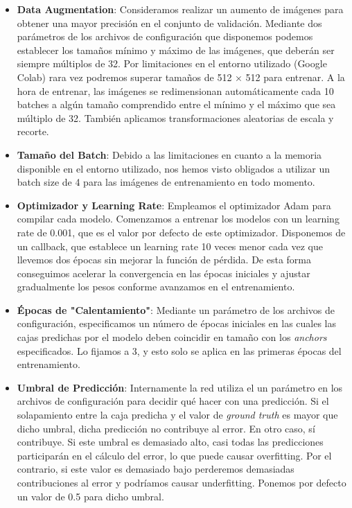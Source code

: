 \documentclass[10pt,twocolumn,letterpaper]{article}
\begin{document}
\begin{itemize}
    \item \textbf{Data Augmentation}: Consideramos realizar un aumento de imágenes para obtener una mayor precisión en el conjunto de validación. Mediante dos parámetros de los archivos de configuración que disponemos podemos establecer los tamaños mínimo y máximo de las imágenes, que deberán ser siempre múltiplos de 32. Por limitaciones en el entorno utilizado (Google Colab) rara vez podremos superar tamaños de 512 × 512 para entrenar. A la hora de entrenar, las imágenes se redimensionan automáticamente cada 10 batches a algún tamaño comprendido entre el mínimo y el máximo que sea múltiplo de 32. También aplicamos transformaciones aleatorias de escala y recorte.
    \item \textbf{Tamaño del Batch}: Debido a las limitaciones en cuanto a la memoria disponible en el entorno utilizado, nos hemos visto obligados a utilizar un batch size de 4 para las imágenes de entrenamiento en todo momento.
    \item \textbf{Optimizador y Learning Rate}: Empleamos el optimizador Adam para compilar cada modelo. Comenzamos a entrenar los modelos con un learning rate de 0.001, que es el valor por defecto de este optimizador. Disponemos de un callback, que establece un learning rate 10 veces menor cada vez que llevemos dos épocas sin mejorar la función de pérdida. De esta forma conseguimos acelerar la convergencia en las épocas iniciales y ajustar gradualmente los pesos conforme avanzamos en el entrenamiento.
    \item \textbf{Épocas de "Calentamiento"}: Mediante un parámetro de los archivos de configuración, especificamos un número de épocas iniciales en las cuales las cajas predichas por el modelo deben coincidir en tamaño con los \textit{anchors} especificados. Lo fijamos a 3, y esto solo se aplica en las primeras épocas del entrenamiento.
    \item \textbf{Umbral de Predicción}: Internamente la red utiliza el un parámetro en los archivos de configuración para decidir qué hacer con una predicción. Si el solapamiento entre la caja predicha y el valor de \textit{ground truth} es mayor que dicho umbral, dicha predicción no contribuye al error. En otro caso, sí contribuye. Si este umbral es demasiado alto, casi todas las predicciones participarán en el cálculo del error, lo que puede causar overfitting. Por el contrario, si este valor es demasiado bajo perderemos demasiadas contribuciones al error y podríamos causar underfitting. Ponemos por defecto un valor de 0.5 para dicho umbral.

\end{itemize}
\end{document}
